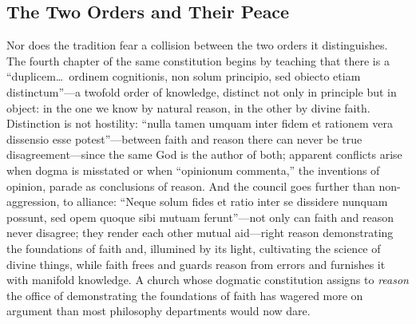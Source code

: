 \subsection{The Two Orders and Their Peace}

Nor does the tradition fear a collision between the two orders it distinguishes. The fourth chapter of the same constitution begins by teaching that there is a ``duplicem\ldots\ ordinem cognitionis, non solum principio, sed obiecto etiam distinctum''---a twofold order of knowledge, distinct not only in principle but in object: in the one we know by natural reason, in the other by divine faith. Distinction is not hostility: ``nulla tamen umquam inter fidem et rationem vera dissensio esse potest''---between faith and reason there can never be true disagreement---since the same God is the author of both; apparent conflicts arise when dogma is misstated or when ``opinionum commenta,'' the inventions of opinion, parade as conclusions of reason. And the council goes further than non-aggression, to alliance: ``Neque solum fides et ratio inter se dissidere nunquam possunt, sed opem quoque sibi mutuam ferunt''---not only can faith and reason never disagree; they render each other mutual aid---right reason demonstrating the foundations of faith and, illumined by its light, cultivating the science of divine things, while faith frees and guards reason from errors and furnishes it with manifold knowledge. A church whose dogmatic constitution assigns to \emph{reason} the office of demonstrating the foundations of faith has wagered more on argument than most philosophy departments would now dare.

